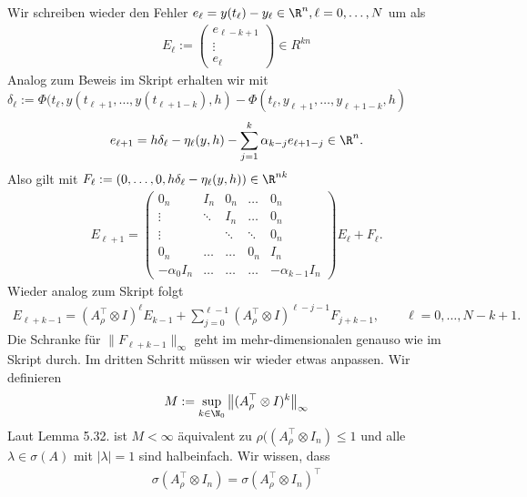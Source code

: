 \begin{solution}
Wir schreiben wieder den Fehler $e_{\ell} = y(t_{\ell}) - y_{\ell} \in \R^n, \ell = 0,\dots,N$ um als
\begin{align*}
  E_{\ell} := \begin{pmatrix}
    e_{\ell - k + 1} \\
    \vdots \\
    e_{\ell}
  \end{pmatrix}
  \in R^{kn}
\end{align*}
Analog zum Beweis im Skript erhalten wir mit
$\delta_{\ell} := \Phi(t_{\ell},y(t_{\ell + 1},\dots,y(t_{\ell+1-k}),h) -
\Phi(t_{\ell},y_{\ell + 1},\dots,y_{\ell+1-k},h)$
\begin{align*}
  e_{\ell + 1} = h\delta_{\ell} - \eta_{\ell}(y,h) - \sum_{j = 1}^k \alpha_{k - j}e_{\ell + 1 - j} \in \R^n.
\end{align*}
Also gilt mit $F_{\ell} := (0,\dots,0,h\delta_{\ell} - \eta_{\ell}(y,h)) \in \R^{nk}$
\begin{align*}
  E_{\ell + 1} = \begin{pmatrix}
    0_n & I_n & 0_n & \hdots & 0_n \\
    \vdots & \ddots & I_n & \hdots & 0_n\\
    \vdots &  & \ddots & \ddots & 0_n \\
    0_n & \hdots & \hdots & 0_n & I_n \\
    -\alpha_0I_n & \hdots & \hdots & \hdots & -\alpha_{k-1}I_n
  \end{pmatrix}E_{\ell} + F_{\ell}.
\end{align*}
Wieder analog zum Skript folgt
\begin{align*}
  E_{\ell + k - 1} =  \left(A_{\rho}^{\top} \otimes I\right)^{\ell}E_{k-1}
  + \sum_{j = 0}^{\ell - 1}\left(A_{\rho}^{\top} \otimes I\right)^{\ell - j - 1}F_{j + k - 1},
  \qquad \ell = 0,\dots,N-k+1.
\end{align*}
Die Schranke für $\|F_{\ell + k - 1}\|_{\infty}$ geht im mehr-dimensionalen
genauso wie im Skript durch.
Im dritten Schritt müssen wir wieder etwas anpassen. Wir definieren
\begin{align*}
  M := \sup_{k \in \N_0} \left\| (A_{\rho}^{\top} \otimes I)^k\right\|_{\infty}
\end{align*}
Laut Lemma 5.32. ist $M < \infty$ äquivalent zu $\rho((A_{\rho}^{\top} \otimes I_n) \leq 1$
und alle $\lambda \in \sigma(A)$ mit $|\lambda| = 1$ sind halbeinfach.
Wir wissen, dass
\begin{align*}
  \sigma(A_{\rho}^{\top} \otimes I_n) = \sigma(A_{\rho}^{\top} \otimes I_n)^{\top}

\end{align*}
\end{solution}
